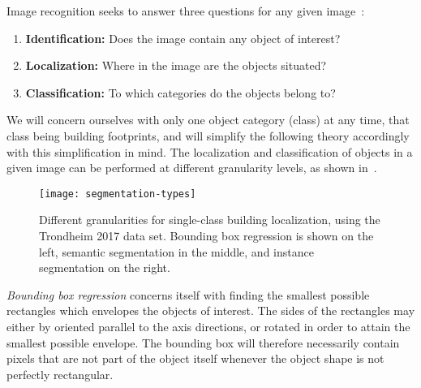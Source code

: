 Image recognition seeks to answer three questions for any given image~\cite{image_recognition}:

\begin{enumerate}[nosep]
  \item \textbf{Identification:} Does the image contain any object of interest?
  \item \textbf{Localization:} Where in the image are the objects situated?
  \item \textbf{Classification:} To which categories do the objects belong to?
\end{enumerate}

We will concern ourselves with only one object category (class) at any time, that class being building footprints, and will simplify the following theory accordingly with this simplification in mind.
The localization and classification of objects in a given image can be performed at different granularity levels, as shown in~.

\begin{figure}[htb]
  \texttt{[image: segmentation-types]}
  \caption{
    Different granularities for single-class building localization, using the Trondheim 2017 data set.
    Bounding box regression is shown on the left, semantic segmentation in the middle, and instance segmentation on the right.
  }%
  \label{fig:segmentation-types}
\end{figure}

\textit{Bounding box regression} concerns itself with finding the smallest possible rectangles which envelopes the objects of interest.
The sides of the rectangles may either by oriented parallel to the axis directions, or rotated in order to attain the smallest possible envelope.
The bounding box will therefore necessarily contain pixels that are not part of the object itself whenever the object shape is not perfectly rectangular.

